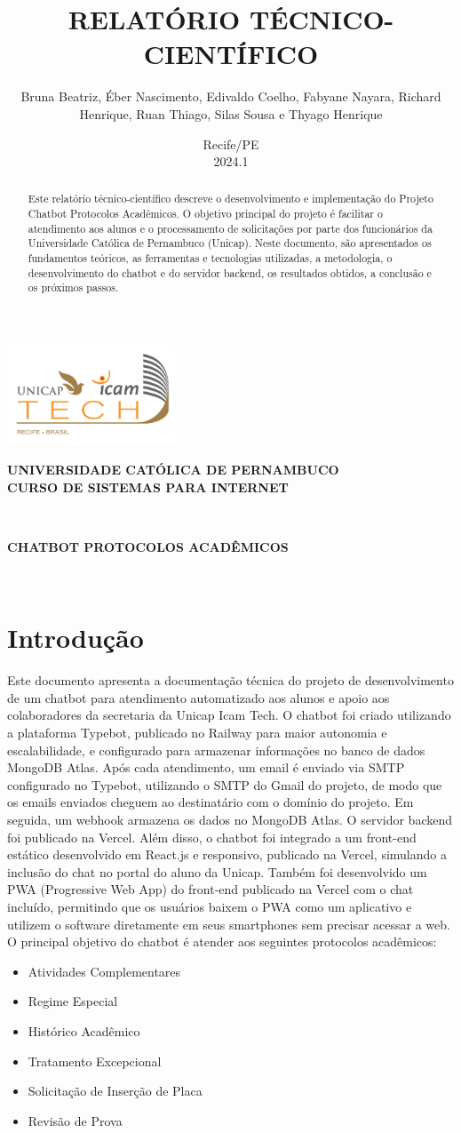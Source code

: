 \documentclass[12pt,a4paper]{article} %
\title{\textbf{\MakeUppercase{Relatório Técnico-Científico}}}
\author{Bruna Beatriz, Éber Nascimento, Edivaldo Coelho, Fabyane Nayara, Richard Henrique, Ruan Thiago, Silas Sousa e Thyago Henrique}
\date{Recife/PE \\ 2024.1}
\renewcommand{\maketitle}{\begin{titlepage}
\begin{center}
\includegraphics[width=5cm]{img/Unicap_Icam_Tech-01.png} \\ %
\vspace*{1cm}

\textbf{\Large\scshape UNIVERSIDADE CATÓLICA DE PERNAMBUCO} \\
\vspace*{0.5cm}
\textbf{\Large\scshape CURSO DE SISTEMAS PARA INTERNET} \\
\vspace*{2cm}

\textbf{\fontsize{18pt}{\baselineskip}\selectfont \MakeUppercase{\thetitle}} \\

\vspace*{0.5cm}

\textbf{\fontsize{14pt}{\baselineskip}\selectfont \MakeUppercase{Chatbot Protocolos Acadêmicos}} \\

\vspace*{2cm}

\textbf{\fontsize{14pt}{\baselineskip}\selectfont \MakeUppercase{\theauthor}} \\

\vfill

\textbf{\Large\MakeUppercase{\thedate}}

\end{center}
\end{titlepage}}
\begin{document}
\maketitle

\newpage

\begin{abstract}
\noindent Este relatório técnico-científico descreve o desenvolvimento e implementação do Projeto Chatbot Protocolos Acadêmicos. O objetivo principal do projeto é facilitar o atendimento aos alunos e o processamento de solicitações por parte dos funcionários da Universidade Católica de Pernambuco (Unicap). Neste documento, são apresentados os fundamentos teóricos, as ferramentas e tecnologias utilizadas, a metodologia, o desenvolvimento do chatbot e do servidor backend, os resultados obtidos, a conclusão e os próximos passos.
\end{abstract}

\newpage

\tableofcontents

\newpage

\section{Introdução}

\noindent Este documento apresenta a documentação técnica do projeto de desenvolvimento de um chatbot para atendimento automatizado aos alunos e apoio aos colaboradores da secretaria da Unicap Icam Tech. O chatbot foi criado utilizando a plataforma Typebot, publicado no Railway para maior autonomia e escalabilidade, e configurado para armazenar informações no banco de dados MongoDB Atlas. Após cada atendimento, um email é enviado via SMTP configurado no Typebot, utilizando o SMTP do Gmail do projeto, de modo que os emails enviados cheguem ao destinatário com o domínio do projeto. Em seguida, um webhook armazena os dados no MongoDB Atlas. O servidor backend foi publicado na Vercel. Além disso, o chatbot foi integrado a um front-end estático desenvolvido em React.js e responsivo, publicado na Vercel, simulando a inclusão do chat no portal do aluno da Unicap. Também foi desenvolvido um PWA (Progressive Web App) do front-end publicado na Vercel com o chat incluído, permitindo que os usuários baixem o PWA como um aplicativo e utilizem o software diretamente em seus smartphones sem precisar acessar a web. O principal objetivo do chatbot é atender aos seguintes protocolos acadêmicos:

\begin{itemize}
    \item Atividades Complementares
    \item Regime Especial
    \item Histórico Acadêmico
    \item Tratamento Excepcional
    \item Solicitação de Inserção de Placa
    \item Revisão de Prova
\end{itemize}
\end{document}

